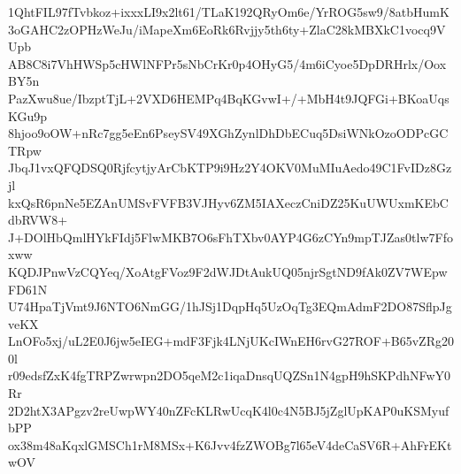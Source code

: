 1QhtFIL97fTvbkoz+ixxxLI9x2lt61/TLaK192QRyOm6e/YrROG5sw9/8atbHumK
3oGAHC2zOPHzWeJu/iMapeXm6EoRk6Rvjjy5th6ty+ZlaC28kMBXkC1vocq9VUpb
AB8C8i7VhHWSp5cHWlNFPr5sNbCrKr0p4OHyG5/4m6iCyoe5DpDRHrlx/OoxBY5n
PazXwu8ue/IbzptTjL+2VXD6HEMPq4BqKGvwI+/+MbH4t9JQFGi+BKoaUqsKGu9p
8hjoo9oOW+nRc7gg5eEn6PseySV49XGhZynlDhDbECuq5DsiWNkOzoODPcGCTRpw
JbqJ1vxQFQDSQ0RjfcytjyArCbKTP9i9Hz2Y4OKV0MuMIuAedo49C1FvIDz8Gzjl
kxQsR6pnNe5EZAnUMSvFVFB3VJHyv6ZM5IAXeczCniDZ25KuUWUxmKEbCdbRVW8+
J+DOlHbQmlHYkFIdj5FlwMKB7O6sFhTXbv0AYP4G6zCYn9mpTJZas0tlw7Ffoxww
KQDJPnwVzCQYeq/XoAtgFVoz9F2dWJDtAukUQ05njrSgtND9fAk0ZV7WEpwFD61N
U74HpaTjVmt9J6NTO6NmGG/1hJSj1DqpHq5UzOqTg3EQmAdmF2DO87SflpJgveKX
LnOFo5xj/uL2E0J6jw5eIEG+mdF3Fjk4LNjUKcIWnEH6rvG27ROF+B65vZRg200l
r09edsfZxK4fgTRPZwrwpn2DO5qeM2c1iqaDnsqUQZSn1N4gpH9hSKPdhNFwY0Rr
2D2htX3APgzv2reUwpWY40nZFcKLRwUcqK4l0c4N5BJ5jZglUpKAP0uKSMyufbPP
ox38m48aKqxlGMSCh1rM8MSx+K6Jvv4fzZWOBg7l65eV4deCaSV6R+AhFrEKtwOV
